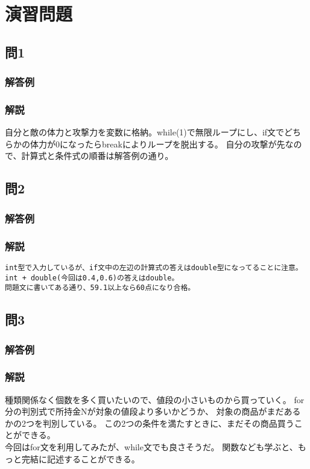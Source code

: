 \section{演習問題}
\subsection{問1}
\subsubsection{解答例}

\subsubsection{解説}
自分と敵の体力と攻撃力を変数に格納。while(1)で無限ループにし、if文でどちらかの体力が0になったらbreakによりループを脱出する。
自分の攻撃が先なので、計算式と条件式の順番は解答例の通り。

\subsection{問2}
\subsubsection{解答例}

\subsubsection{解説}
\begin{verbatim}
int型で入力しているが、if文中の左辺の計算式の答えはdouble型になってることに注意。
int + double(今回は0.4,0.6)の答えはdouble。
問題文に書いてある通り、59.1以上なら60点になり合格。
\end{verbatim}

\subsection{問3}
\subsubsection{解答例}

\subsubsection{解説}
種類関係なく個数を多く買いたいので、値段の小さいものから買っていく。
for分の判別式で所持金Nが対象の値段より多いかどうか、
対象の商品がまだあるかの2つを判別している。
この2つの条件を満たすときに、まだその商品買うことができる。\\
今回はfor文を利用してみたが、while文でも良さそうだ。
関数なども学ぶと、もっと完結に記述することができる。
